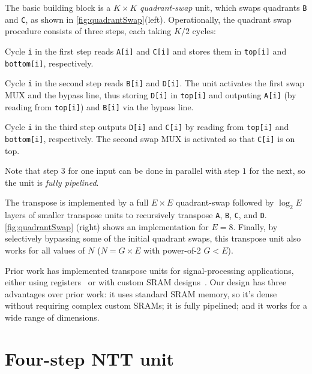 The basic building block is a $K \times K$ \textit{quadrant-swap} unit, which swaps quadrants \texttt{B} and \texttt{C}, as shown in \autoref{fig:quadrantSwap}(left). Operationally, the quadrant swap procedure consists of three steps, each taking $K/2$ cycles:
\begin{compactenum}
  \item Cycle \texttt{i} in the first step reads \texttt{A[i]} and \texttt{C[i]} and stores them in \texttt{top[i]} and \texttt{bottom[i]}, respectively.
\item Cycle \texttt{i} in the second step reads \texttt{B[i]} and \texttt{D[i]}. The unit activates the first swap MUX and the bypass line, thus storing \texttt{D[i]} in \texttt{top[i]} and outputing \texttt{A[i]} (by reading from \texttt{top[i]}) and \texttt{B[i]} via the bypass line.
\item Cycle \texttt{i} in the third step outputs \texttt{D[i]} and \texttt{C[i]} by reading from \texttt{top[i]} and \texttt{bottom[i]}, respectively. The second swap MUX is activated so that \texttt{C[i]} is on top.
\end{compactenum}
Note that step $3$ for one input can be done in parallel with step $1$ for the next, so the unit is \emph{fully pipelined}.

The transpose is implemented by a full $E \times E$ quadrant-swap followed by $\log_2E$ layers of smaller transpose units
to recursively transpose \texttt{A}, \texttt{B}, \texttt{C}, and \texttt{D}. \autoref{fig:quadrantSwap} (right) shows an implementation for $E=8$. Finally, by selectively bypassing some of the initial quadrant swaps,
this transpose unit also works for all values of $N$ ($N=G\times E$ with power-of-2 $G < E$).

Prior work has implemented transpose units for signal-processing applications,
either using registers~\cite{wang2018pipelined,zhang2020novel} or with custom SRAM designs~\cite{shang2014single}.
Our design has three advantages over prior work: it uses standard SRAM memory,
so it's dense without requiring complex custom SRAMs;
it is fully pipelined; and it works for a wide range of dimensions.

\section{Four-step NTT unit}\label{sec:fourStepNTT}

\figFourStepNTT


